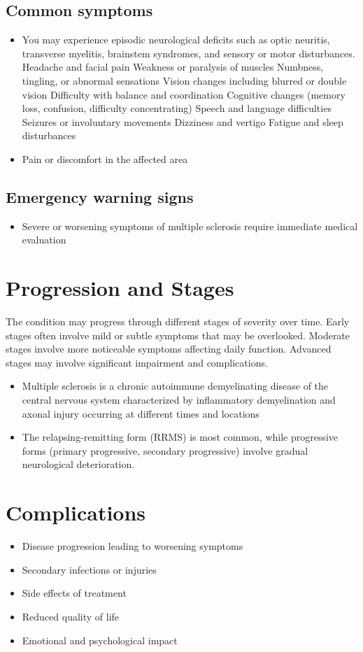 \subsection{Common symptoms}
\begin{itemize}[noitemsep]
  \item You may experience episodic neurological deficits such as optic neuritis, transverse myelitis, brainstem syndromes, and sensory or motor disturbances. Headache and facial pain Weakness or paralysis of muscles Numbness, tingling, or abnormal sensations Vision changes including blurred or double vision Difficulty with balance and coordination Cognitive changes (memory loss, confusion, difficulty concentrating) Speech and language difficulties Seizures or involuntary movements Dizziness and vertigo Fatigue and sleep disturbances
  \item Pain or discomfort in the affected area
  \end{itemize}
\subsection{Emergency warning signs}
\begin{itemize}[noitemsep]
  \item Severe or worsening symptoms of multiple sclerosis require immediate medical evaluation
\end{itemize}
\section{Progression and Stages}
The condition may progress through different stages of severity over time. Early stages often involve mild or subtle symptoms that may be overlooked. Moderate stages involve more noticeable symptoms affecting daily function. Advanced stages may involve significant impairment and complications.

\begin{itemize}[noitemsep]
  \item Multiple sclerosis is a chronic autoimmune demyelinating disease of the central nervous system characterized by inflammatory demyelination and axonal injury occurring at different times and locations
  \item The relapsing-remitting form (RRMS) is most common, while progressive forms (primary progressive, secondary progressive) involve gradual neurological deterioration.
\end{itemize}
\section{Complications}
\begin{itemize}[noitemsep]
  \item Disease progression leading to worsening symptoms
  \item Secondary infections or injuries
  \item Side effects of treatment
  \item Reduced quality of life
  \item Emotional and psychological impact
\end{itemize}
